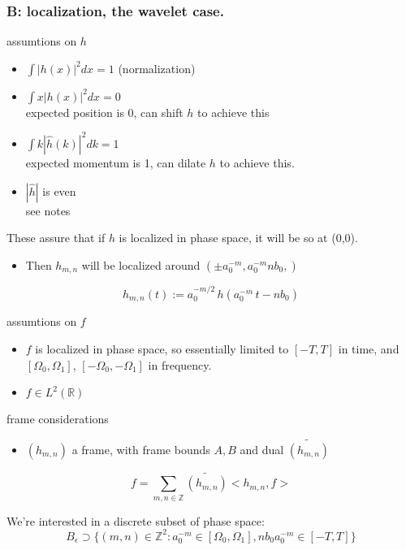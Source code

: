 \documentclass{beamer}
\newcommand{\ints}[0] { \mathbb{Z}}
\newcommand{\reals}[0] { \mathbb{R}}
\newcommand{\eps}[0] {  \epsilon }
\begin{document}
\begin{frame}
\frametitle{B: localization, the wavelet case.}

assumtions on $h$
\begin{itemize}
\item $ \int|h(x)|^2 dx = 1 $ (normalization) \\
\item $ \int x |h(x)|^2 dx = 0 $ \\
\indent expected position is 0, can shift $h$ to achieve this
\item $ \int k |\hat h(k)|^2 dk = 1 $ \\
\indent expected momentum is 1, can dilate $h$ to achieve this.
\item $ | \hat{h} |$ is even \\
\indent see notes
\end{itemize}

\begin{flushleft}
These assure that if $h$ is localized in phase space, it will be so at (0,0).
\end{flushleft}

\begin{itemize}
\item Then $h_{m,n}$ will be localized around $( \pm a_0^{-m}, a_0^{-m} n b_0,  )$
\end{itemize}

\begin{equation*}
h_{m,n} (t) := a_0^{-m/2} \, h(a_0^{-m} \, t - n b_0)
\end{equation*}


\end{frame}


\begin{frame}

assumtions on $f$
\begin{itemize}
\item $f$ is localized in phase space, so essentially limited to $[-T,T]$ in time, and $[\Omega_0, \Omega_1]$, $[-\Omega_0, -\Omega_1]$ in frequency.  \\
\item $f \in L^2(\reals)$ \\
\end{itemize}

frame considerations
\begin{itemize}
\item $(h_{m,n})$ a frame, with frame bounds $A,B$ and dual $ \tilde{ ( h_{m,n}) } $\\
\end{itemize}

\begin{equation*}
f = \sum_{m,n \in \ints} \tilde{ ( h_{m,n}) } < h_{m,n}, f>
\end{equation*}

We're interested in a discrete subset of phase space:
\begin{equation*}
B_\eps \supset  \{ (m,n) \in \ints^2:  a_0^{-m} \in [ \Omega_0, \Omega_1],   n b_0 a_0^{-m} \in [ -T, T ]   \}
\end{equation*}


\end{frame}
\end{document}
